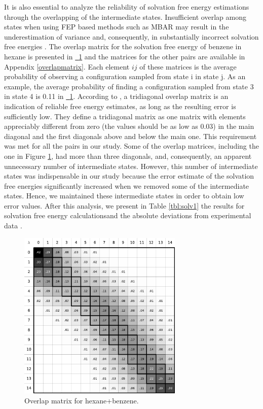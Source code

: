 \documentclass[
	12pt,				%
	openany,			%
	oneside,			%
	a4paper,			%
	english,			%
	brazil				%
	]{abntex2}
\providecommand{\DIFadd}[1]{{\protect\color{blue}\uwave{#1}}}
\providecommand{\DIFaddbegin}{}
\providecommand{\DIFaddend}{}
\providecommand{\DIFdelend}{}
\newcommand{\figref}[2][{}]{\hyperref[#2]{\figurename~\ref{#2}#1}}
\providecommand{\DIFadd}[1]{{\protect\color{blue}\uwave{#1}}} %
\providecommand{\DIFaddbegin}{} %
\providecommand{\DIFaddend}{} %
\providecommand{\DIFdelend}{} %
\begin{document}
\DIFdelend \DIFaddbegin \FloatBarrier
\DIFaddend It is also essential to analyze the reliability of solvation free energy estimations through the overlapping of the intermediate states. Insufficient overlap among states when using FEP based methods such as MBAR may result in the underestimation of variance and, consequently, in substantially incorrect solvation free energies \cite{klimovich}. The overlap matrix for the solvation free energy of benzene in hexane is presented in \figref{fig:hexove} and the matrices for the other pairs are available in Appendix \ref{overlapmatrix}. Each element $ij$ of these matrices is the average probability of observing a configuration sampled from state i in state j. As an example, the average probability of finding a configuration sampled from state 3 in state 4 is 0.11 in \figref{fig:hexove}. According to , a tridiagonal overlap matrix is an indication of reliable free energy estimates, as long as the resulting error is sufficiently low. They define a tridiagonal matrix as one matrix with elements appreciably different from zero (the values should be as low as 0.03) in the main diagonal and the first diagonals above and below the main one. This requirement was met for all the pairs in our study. Some of the overlap matrices, including the one in Figure \ref{fig:hexove}, had more than three diagonals, and, consequently, an apparent unnecessary number of intermediate states. However, this number of intermediate states was indispensable in our study because the error estimate of the solvation free energies significantly increased when we removed some of the intermediate states. Hence, we maintained these intermediate states in order to obtain low error values. After this analysis, we present in Table \ref{tbl:solv1} the results for solvation free energy calculations\DIFaddbegin \DIFadd{, the errors from these estimations with MBAR, }\DIFaddend and the absolute deviations from experimental data \cite{doi:10.1021/ci034120c}.  

\begin{figure}[h]
	\centering
	\includegraphics[width=0.7\textwidth]{Figures/ohex_benz}
	\caption{Overlap matrix for hexane+benzene.}
	\label{fig:hexove}
\end{figure}
\end{document}
